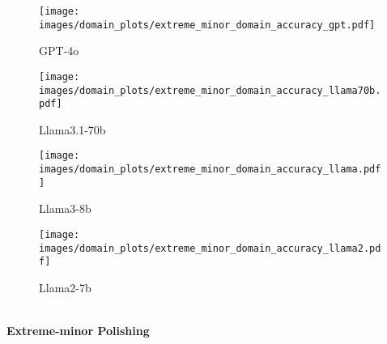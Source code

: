 \begin{figure*}[htbp]
    \centering
    \begin{minipage}{\textwidth} %
        \centering
        \begin{subfigure}{0.24\textwidth}
            \centering
            \texttt{[image: images/domain\_plots/extreme\_minor\_domain\_accuracy\_gpt.pdf]}
            \caption{GPT-4o}
        \end{subfigure}
        \hfill
        \begin{subfigure}{0.24\textwidth}
            \centering
            \texttt{[image: images/domain\_plots/extreme\_minor\_domain\_accuracy\_llama70b.pdf]}
            \caption{Llama3.1-70b}
        \end{subfigure}
        \hfill
        \begin{subfigure}{0.24\textwidth}
            \centering
            \texttt{[image: images/domain\_plots/extreme\_minor\_domain\_accuracy\_llama.pdf]}
            \caption{Llama3-8b}
        \end{subfigure}
        \hfill
        \begin{subfigure}{0.24\textwidth}
            \centering
            \texttt{[image: images/domain\_plots/extreme\_minor\_domain\_accuracy\_llama2.pdf]}
            \caption{Llama2-7b}
        \end{subfigure}
        \\ %
        \vspace{0.2cm}
        \small \textbf{Extreme-minor Polishing}
    \end{minipage}
    

\end{figure*}
